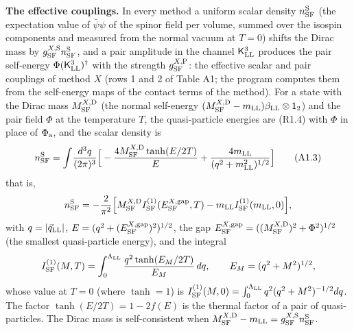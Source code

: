 \documentclass[
  10pt,
]{article}
\begin{document}
\textbf{The effective couplings.} In every method a uniform scalar
density \(n^{\rm S}_{\rm SF}\) (the expectation value of
\(\bar\psi\psi\) of the spinor field per volume, summed over the isospin
components and measured from the normal vacuum at \(T=0\)) shifts the
Dirac mass by \(g^{X,{\rm S}}_{\rm SF}n^{\rm S}_{\rm SF}\), and a pair
amplitude in the channel \(\mathsf K^3_{\rm LL}\) produces the pair
self-energy \(\Phi(\mathsf K^3_{\rm LL})^\dagger\) with the strength
\(g^{X,{\rm P}}_{\rm SF}\): the effective scalar and pair couplings of
method \(X\) (rows 1 and 2 of Table A1; the program computes them from
the self-energy maps of the contact terms of the method). For a state
with the Dirac mass \(M^{X,{\rm D}}_{\rm SF}\) (the normal self-energy
\((M^{X,{\rm D}}_{\rm SF}-m_{\rm LL})\beta_{\rm LL}\otimes\mathsf 1_2\))
and the pair field \(\Phi\) at the temperature \(T\), the quasi-particle
energies are (R1.4) with \(\Phi\) in place of \(\Phi_{\rm a}\), and the
scalar density is
\[n^{\rm S}_{\rm SF}=\int\!\frac{d^3q}{(2\pi)^3}\Big[-\frac{4M^{X,{\rm D}}_{\rm SF}\tanh(E/2T)}E+\frac{4m_{\rm LL}}{(q^2+m_{\rm LL}^2)^{1/2}}\Big]\tag{A1.3}\]
that is,
\[n^{\rm S}_{\rm SF}=-\frac2{\pi^2}\Big[M^{X,{\rm D}}_{\rm SF}I^{(1)}_{\rm SF}(E^{X,{\rm gap}}_{\rm SF},T)-m_{\rm LL}I^{(1)}_{\rm SF}(m_{\rm LL},0)\Big],\]
with \(q=\lvert\vec q_{\rm LL}\rvert\),
\(E=(q^2+(E^{X,{\rm gap}}_{\rm SF})^2)^{1/2}\), the gap
\(E^{X,{\rm gap}}_{\rm SF}=((M^{X,{\rm D}}_{\rm SF})^2+\Phi^2)^{1/2}\)
(the smallest quasi-particle energy), and the integral
\[I^{(1)}_{\rm SF}(M,T)=\int_0^{\Lambda_{\rm LL}}\frac{q^2\tanh(E_M/2T)}{E_M}\,dq,\qquad E_M=(q^2+M^2)^{1/2},\]
whose value at \(T=0\) (where \(\tanh=1\)) is
\(I^{(1)}_{\rm SF}(M,0)=\int_0^{\Lambda_{\rm LL}}q^2(q^2+M^2)^{-1/2}dq\).
The factor \(\tanh(E/2T)=1-2f(E)\) is the thermal factor of a pair of
quasi-particles. The Dirac mass is self-consistent when
\(M^{X,{\rm D}}_{\rm SF}-m_{\rm LL}=g^{X,{\rm S}}_{\rm SF}n^{\rm S}_{\rm SF}\).
\end{document}
